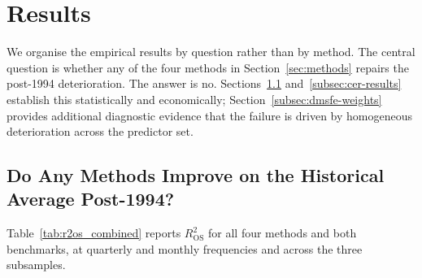 \documentclass[a4paper,11pt]{article}
\begin{document}
\section{Results}\label{sec:results}

We organise the empirical results by question rather than by method. The
central question is whether any of the four methods in
Section~\ref{sec:methods} repairs the post-1994 deterioration. The
answer is no. Sections~\ref{subsec:stat-results}
and~\ref{subsec:cer-results} establish this statistically and
economically; Section~\ref{subsec:dmsfe-weights} provides additional
diagnostic evidence that the failure is driven by homogeneous
deterioration across the predictor set.

\subsection{Do Any Methods Improve on the Historical Average Post-1994?}\label{subsec:stat-results}

Table~\ref{tab:r2os_combined} reports $R^2_{\mathrm{OS}}$ for all four
methods and both benchmarks, at quarterly and monthly frequencies and
across the three subsamples.
\end{document}
